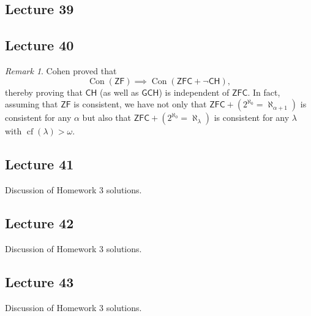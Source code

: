 \documentclass[10pt,letterpaper,cm]{nupset}
\theoremstyle{definition}
\theoremstyle{theorem}
\theoremstyle{remark}
\newtheorem{remark}[definition]{Remark}
\newcommand{\1}{\mathbf{1}}
\newcommand{\0}{\vec 0}
\newcommand{\zf}{\mathsf{ZF}}
\newcommand{\zfc}{\mathsf{ZFC}}
\DeclareMathOperator{\cf}{cf}
\DeclareMathOperator{\con}{Con}
\begin{document}
\subsection{Lecture 39}

\subsection{Lecture 40}

\begin{remark}
Cohen proved that $$\con(\zf) \implies \con(\zfc + \neg{\mathsf{CH}}),$$ thereby proving that $\mathsf{CH}$ (as well as $\mathsf{GCH}$) is independent of $\zfc$.  In fact, assuming that $\zf$ is consistent, we have not only that $\zfc + (2^{\aleph_0} = \aleph_{\alpha +1})$ is consistent for any $\alpha$ but also that $\zfc + (2^{\aleph_0} = \aleph_{\lambda})$ is consistent for any $\lambda$ with $\cf(\lambda) > \omega$.
\end{remark}

\subsection{Lecture 41}
Discussion of Homework 3 solutions.

\subsection{Lecture 42}
Discussion of Homework 3 solutions.

\subsection{Lecture 43}
Discussion of Homework 3 solutions.
\end{document}
